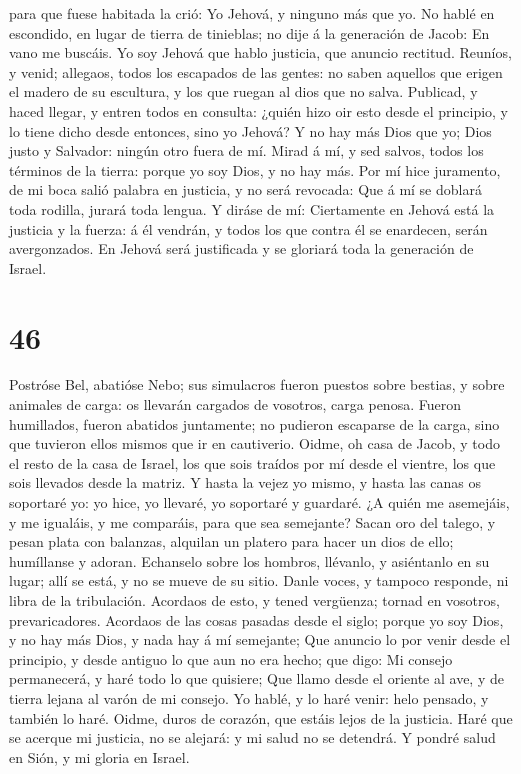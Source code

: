 para que fuese habitada la crió: Yo Jehová, y ninguno más que yo.
 No hablé en escondido, en lugar de tierra de tinieblas; no
dije á la generación de Jacob: En vano me buscáis. Yo soy Jehová que
hablo justicia, que anuncio rectitud.  Reuníos, y venid;
allegaos, todos los escapados de las gentes: no saben aquellos que
erigen el madero de su escultura, y los que ruegan al dios que no salva.
 Publicad, y haced llegar, y entren todos en consulta:
¿quién hizo oir esto desde el principio, y lo tiene dicho desde
entonces, sino yo Jehová? Y no hay más Dios que yo; Dios justo y
Salvador: ningún otro fuera de mí.  Mirad á mí, y sed
salvos, todos los términos de la tierra: porque yo soy Dios, y no hay
más.  Por mí hice juramento, de mi boca salió palabra en
justicia, y no será revocada: Que á mí se doblará toda rodilla, jurará
toda lengua.  Y diráse de mí: Ciertamente en Jehová está la
justicia y la fuerza: á él vendrán, y todos los que contra él se
enardecen, serán avergonzados.  En Jehová será justificada
y se gloriará toda la generación de Israel.

\hypertarget{section-45}{%
\section{46}\label{section-45}}

 Postróse Bel, abatióse Nebo; sus simulacros fueron puestos
sobre bestias, y sobre animales de carga: os llevarán cargados de
vosotros, carga penosa.  Fueron humillados, fueron abatidos
juntamente; no pudieron escaparse de la carga, sino que tuvieron ellos
mismos que ir en cautiverio.  Oidme, oh casa de Jacob, y
todo el resto de la casa de Israel, los que sois traídos por mí desde el
vientre, los que sois llevados desde la matriz.  Y hasta la
vejez yo mismo, y hasta las canas os soportaré yo: yo hice, yo llevaré,
yo soportaré y guardaré.  ¿A quién me asemejáis, y me
igualáis, y me comparáis, para que sea semejante?  Sacan oro
del talego, y pesan plata con balanzas, alquilan un platero para hacer
un dios de ello; humíllanse y adoran.  Echanselo sobre los
hombros, llévanlo, y asiéntanlo en su lugar; allí se está, y no se mueve
de su sitio. Danle voces, y tampoco responde, ni libra de la
tribulación.  Acordaos de esto, y tened vergüenza; tornad en
vosotros, prevaricadores.  Acordaos de las cosas pasadas
desde el siglo; porque yo soy Dios, y no hay más Dios, y nada hay á mí
semejante;  Que anuncio lo por venir desde el principio, y
desde antiguo lo que aun no era hecho; que digo: Mi consejo permanecerá,
y haré todo lo que quisiere;  Que llamo desde el oriente al
ave, y de tierra lejana al varón de mi consejo. Yo hablé, y lo haré
venir: helo pensado, y también lo haré.  Oidme, duros de
corazón, que estáis lejos de la justicia.  Haré que se
acerque mi justicia, no se alejará: y mi salud no se detendrá. Y pondré
salud en Sión, y mi gloria en Israel.

